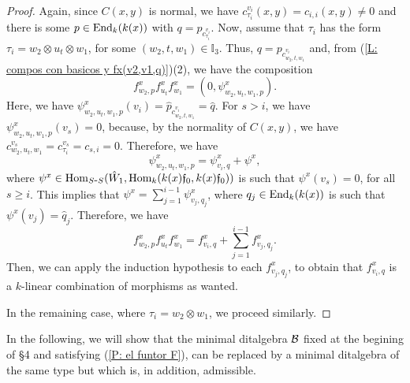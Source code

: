 \documentclass{article}
\theoremstyle{definition}
\newcommand{\End}{{ \rm End }}
\newcommand{\Hom}{{ \rm Hom }}
\renewcommand{\frak}{\mathfrak}
\newcommand{\g}{\hbox{-}}
\newcommand{\hueca}[1]{\mathbb{#1}}
\begin{document}
\begin{proof}
Again, since $C(x,y)$ is normal, we have $c^{v_i}_{\tau_i}(x,y)=c_{i,i}(x,y)\not=0$ and there is some $p\in \End_k(k(x))$ with $q=p_{c_{\tau_i}^{v_i}}$. Now, assume that $\tau_i$ has the form $\tau_i=w_2\otimes u_t\otimes w_1$, for some $(w_2,t,w_1)\in \hueca{I}_3$. Thus, $q=p_{c_{w_2,t,w_1}^{v_i}}$ and, from (\ref{L: compos con basicos y fx(v2,v1,q)})(2), we have the composition
$$f^x_{w_2,p}f^x_{u_t}f^x_{w_1}=(0,\psi^x_{w_2,u_t,w_1,p}).$$  
Here, we have $\psi^x_{w_2,u_t,w_1,p}(v_i)=\hat{p}_{c^{v_i}_{w_2,t,w_1}}=\hat{q}$. 
For $s>i$, we have $\psi^x_{w_2,u_t,w_1,p}(v_s)=0$, because, by the normality of $C(x,y)$, we have $c_{w_2,u_t,w_1}^{v_s}=c^{v_s}_{\tau_i}=c_{s,i}=0$. Therefore, we have 
$$\psi^x_{w_2,u_t,w_1,p}=\psi^x_{v_i,q}+\psi^x,$$
 where $\psi^x\in \Hom_{S\g S}(\hat{W}_1,\Hom_k(k(x)\frak{f}_0,k(x)\frak{f}_0))$ is such that  $\psi^x(v_s)=0$, for all $s\geq i$. This implies that $\psi^x=\sum_{j=1}^{i-1}\psi^x_{v_j,q_j}$, where $q_j\in \End_k(k(x))$ is such that $\psi^x(v_j)=\hat{q}_j$. Therefore, we have 
  $$f^x_{w_2,p}f^x_{u_t}f^x_{w_1}=f^x_{v_i,q}+\sum_{j=1}^{i-1}f^x_{v_j,q_j}.$$
  Then, we can apply the induction hypothesis to each $f^x_{v_j,q_j}$, to obtain that $f^x_{v_i,q}$ is a $k$-linear combination of morphisms as wanted. 
  
  In the remaining case, where $\tau_i=w_2\otimes w_1$, we proceed similarly. 
\end{proof}
 
 In the following, we will show that the  minimal ditalgebra ${\cal B}$ fixed at the begining of \S4 and satisfying (\ref{P: el funtor F}), can be replaced by a minimal ditalgebra of the same type but which is, in addition, admissible. 
\end{document}
